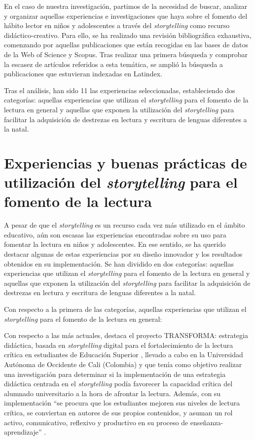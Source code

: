 \documentclass[spanish]{textolivre}
\begin{document}
En el caso de nuestra investigación, partimos de la necesidad de buscar, analizar y organizar aquellas experiencias e investigaciones que haya sobre el fomento del hábito lector en niños y adolescentes a través del \textit{storytelling} como recurso didáctico-creativo. Para ello, se ha realizado una revisión bibliográfica exhaustiva, comenzando por aquellas publicaciones que están recogidas en las bases de datos de la Web of Science y Scopus. Tras realizar una primera búsqueda y comprobar la escasez de artículos referidos a esta temática, se amplió la búsqueda a publicaciones que estuvieran indexadas en Latindex.

Tras el análisis, han sido 11 las experiencias seleccionadas, estableciendo dos categorías: aquellas experiencias que utilizan el \textit{storytelling} para el fomento de la lectura en general y aquellas que exponen la utilización del \textit{storytelling} para facilitar la adquisición de destrezas en lectura y escritura de lenguas diferentes a la natal. 

\section{Experiencias y buenas prácticas de utilización del \textit{storytelling} para el fomento de la lectura}\label{sec-organizacao-latex}
A pesar de que el \textit{storytelling} es un recurso cada vez más utilizado en el ámbito educativo, aún son escasas las experiencias encontradas sobre su uso para fomentar la lectura en niños y adolescentes. En ese sentido, se ha querido destacar algunas de estas experiencias por su diseño innovador y los resultados obtenidos en su implementación. Se han dividido en dos categorías: aquellas experiencias que utilizan el \textit{storytelling} para el fomento de la lectura en general y aquellas que exponen la utilización del \textit{storytelling} para facilitar la adquisición de destrezas en lectura y escritura de lenguas diferentes a la natal.

Con respecto a la primera de las categorías, aquellas experiencias que utilizan el \textit{storytelling} para el fomento de la lectura en general:

Con respecto a las más actuales, destaca el proyecto TRANSFORMA: estrategia didáctica, basada en \textit{storytelling} digital para el fortalecimiento de la lectura crítica en estudiantes de Educación Superior \cite{bonillapardotrasforma:2021}, llevado a cabo en la Universidad Autónoma de Occidente de Cali (Colombia) y que tenía como objetivo realizar una investigación para determinar si la implementación de una estrategia didáctica centrada en el \textit{storytelling} podía favorecer la capacidad crítica del alumnado universitario a la hora de afrontar la lectura. Además, con su implementación “se procura que los estudiantes mejoren sus niveles de lectura crítica, se conviertan en autores de sus propios contenidos, y asuman un rol activo, comunicativo, reflexivo y productivo en su proceso de enseñanza-aprendizaje” \cite[p. 1]{bonillapardotrasforma:2021}.
\end{document}
